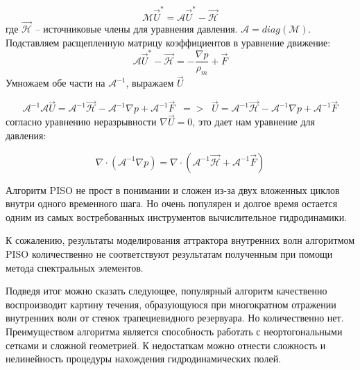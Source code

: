 \begin{equation}
    \mathcal{M} \vec{U}^* = \mathcal{A} \vec{U}^* - \mathcal{\vec{H}}
\end{equation}
где $\mathcal{\vec{H}}$ -- источниковые члены для уравнения давления. $\mathcal{A}=diag(\mathcal{M})$. Подставляем расщепленную матрицу коэффициентов в уравнение движение:
\begin{equation}
    \mathcal{A} \vec{U}^* - \mathcal{\vec{H}}= -\frac{\nabla p}{\rho_m} + \vec{F}    
\end{equation}
Умножаем обе части на $\mathcal{A}^{-1}$, выражаем $\vec U$

\begin{equation}
    \mathcal{A}^{-1} \mathcal{A} \vec{U} = \mathcal{A}^{-1} \mathcal{\vec{H}} - \mathcal{A}^{-1} \nabla p + \mathcal{A}^{-1} \vec{F} \;\;=>\;\;
    \vec{U} = \mathcal{A}^{-1} \mathcal{\vec{H}} - \mathcal{A}^{-1} \nabla p + \mathcal{A}^{-1} \vec{F}
\end{equation}
согласно уравнению неразрывности $\nabla \vec{U} = 0$, это дает нам уравнение для давления:

\begin{equation}
    \nabla \cdot (\mathcal{A}^{-1} \nabla p) = \nabla \cdot (\mathcal{A}^{-1} \mathcal{\vec{H}} + \mathcal{A}^{-1} \vec{F})
\end{equation}

Алгоритм PISO не прост в понимании и сложен из-за двух вложенных циклов внутри одного временного шага. Но очень популярен и долгое время остается одним из самых востребованных инструментов вычислительное гидродинамики.

К сожалению, результаты моделирования аттрактора внутренних волн алгоритмом PISO количественно не соответствуют результатам полученным при помощи метода спектральных элементов. 

Подведя итог можно сказать следующее, популярный алгоритм качественно воспроизводит картину течения, образующуюся при многократном отражении внутренних волн от стенок трапециевидного резервуара. Но количественно нет. Преимуществом алгоритма является способность работать с неортогональными сетками и сложной геометрией. К недостаткам можно отнести сложность и нелинейность процедуры нахождения гидродинамических полей.


